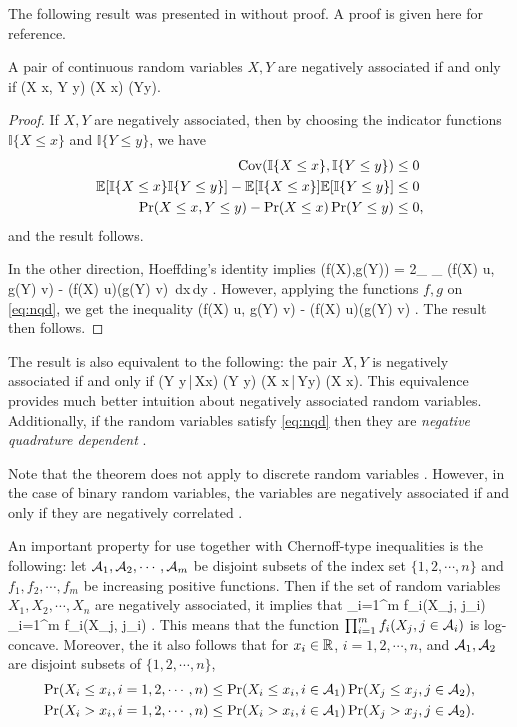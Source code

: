 The following result was presented in \cite{JoagDev83NA} without proof. A proof is given here for
reference.
\begin{thm}
A pair of continuous random variables $X,Y$ are negatively associated if and only if 
\be
\Pr(X \le x, Y \le y) \le \Pr(X \le x) \Pr(Y\le y).
\label{eq:nqd}
\ee
\end{thm}
\begin{proof}
If $X,Y$ are negatively associated, then by choosing the indicator functions
$\mathbb{I} \{X \le x\}$ and $\mathbb{I}\{Y \le y\}$, we have
\begin{align*}
\text{Cov}(\mathbb{I}\{X \le x\}, \mathbb{I}\{Y \le y\}) &\le 0\\
\mathbb E[\mathbb{I}\{X \le x\}\mathbb{I}\{Y \le y\}] - \mathbb E[\mathbb{I}\{X \le x\}] \mathbb E[\mathbb{I}\{Y \le y\}] &\le 0\\
\Pr(X \le x, Y \le y) - \Pr(X \le x) \Pr(Y\le y) &\le 0,
\end{align*}
and the result follows.

In the other direction, Hoeffding's identity \cite{Hoeffding63Bounded} implies
\ben
\Cov(f(X),g(Y)) = 2\int_{\Real} \int_{\Real} \Pr(f(X) \le u, g(Y) \le v) - \Pr(f(X) \le u)\Pr(g(Y) \le v) \,dx\,dy .
\een
However, applying the functions $f,g$ on \autoref{eq:nqd}, we get the inequality
\ben
\Pr(f(X) \le u, g(Y) \le v) - \Pr(f(X) \le u)\Pr(g(Y) \le v) .
\een
The result then follows.
\end{proof}

The result is also equivalent to the following: the pair $X,Y$ is negatively associated if and only if
\ben
\Pr(Y \le y\,|\,X\le x) \le \Pr(Y \le y)  \Pr(X \le x\,|\,Y\le y) \le \Pr(X \le x).
\een
This equivalence provides much better intuition about negatively associated random variables. Additionally,
if the random variables satisfy \autoref{eq:nqd} then they are \textit{negative quadrature dependent}
\cite{Lehmann66NQD}.

Note that the theorem does not apply to discrete random variables \ie . However, in the case of
binary random variables, the variables are negatively associated if and only if 
they are negatively correlated \cite{Dubhashi96BallsNA}.

An important property for use together with Chernoff-type inequalities is the following: let 
$\mathcal{A}_1,\mathcal{A}_2, \cdots, \mathcal{A}_m$ be disjoint subsets of the index set $\{1,2,\cdots,n\}$ and
$f_1,f_2,\cdots,f_m$ be increasing positive functions. Then if the set of random variables
$X_1,X_2,\cdots,X_n$ are negatively associated, it implies that
\ben
\E\left\lbrack \prod_{i=1}^m f_i(X_j, j\in \cA_i) \right\rbrack 
\le  \prod_{i=1}^m \E\left\lbrack f_i(X_j, j\in \cA_i) \right\rbrack .
\een
This means that the function $\prod_{i=1}^m f_i(X_j, j\in \mathcal{A}_i)$ is log-concave. Moreover,
the it also follows that for $x_i \in \mathbb R$, $i = 1,2,\cdots,n$, and $\mathcal{A}_1, \mathcal{A}_2$ are
disjoint subsets of $\{1,2,\cdots,n\}$, 
\begin{align}
\Pr(X_i \le x_i, i=1,2,\cdots,n) &\le \Pr(X_i \le x_i, i\in \mathcal{A}_1) \Pr(X_j \le x_j, j\in \mathcal{A}_2),\\
\Pr(X_i > x_i, i=1,2,\cdots,n) &\le \Pr(X_i > x_i, i\in \mathcal{A}_1) \Pr(X_j > x_j, j\in \mathcal{A}_2).
\end{align}

